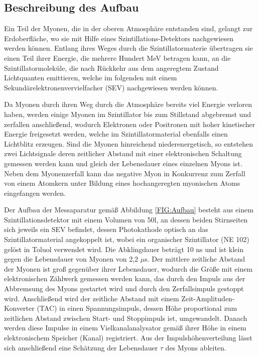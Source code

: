 \subsection{Beschreibung des Aufbau}
Ein Teil der Myonen, die in der oberen Atmosphäre entstanden sind, gelangt zur Erdoberfläche, wo sie  mit Hilfe eines Szintillations-Detektors nachgewiesen werden können. Entlang ihres Weges durch die Szintillatormaterie übertragen sie einen Teil ihrer Energie, die mehrere Hundert MeV betragen kann, an die Szintillatormoleküle, die nach Rückkehr aus dem angeregtem Zustand Lichtquanten emittieren, welche im folgenden mit einem Sekundärelektronenvervielfacher (SEV) nachgewiesen werden können.

Da Myonen durch ihren Weg durch die Atmosphäre bereits viel Energie verloren haben, werden einige Myonen im Szintillator bis zum Stillstand abgebremst und zerfallen anschließend, wodurch Elektronen oder Positronen mit hoher kinetischer Energie freigesetzt werden, welche im Szintillatormaterial ebenfalls einen Lichtblitz erzeugen. Sind die Myonen hinreichend niederenergetisch, so entstehen zwei Lichtsignale deren zeitlicher Abstand mit einer elektronischen Schaltung gemessen werden kann und gleich der Lebensdauer eines einzelnen Myons ist. Neben dem Myonenzerfall kann das negative Myon in Konkurrenz zum Zerfall von einem Atomkern unter Bildung eines hochangeregten myonischen Atoms eingefangen werden.

Der Aufbau der Messaparatur gemäß Abbildung \ref{FIG:Aufbau} besteht aus einem Szintillationsdetektor mit einem Volumen von 50l, an dessen beiden Stirnseiten sich jeweils ein SEV befindet, dessen Photokathode optisch an das Szintillatormaterial angekoppelt ist, wobei ein organischer Szintillator (NE  102) gelöst in Toluol verwendet wird. Die Abklingdauer beträgt 10 ns und ist klein gegen die Lebensdauer von Myonen von 2,2 $\mu$s\cite{PDG}. Der mittlere zeitliche Abstand der Myonen ist groß gegenüber ihrer Lebensdauer, wodurch die Größe mit einem elektronischen Zählwerk gemessen werden kann, das durch den Impuls aus der Abbremsung des Myons gestartet wird und durch den Zerfallsimpuls gestoppt wird. Anschließend wird der zeitliche Abstand mit einem Zeit-Amplituden-Konverter (TAC) in einen Spannungsimpuls, dessen Höhe proportional zum zeitlichen Abstand zwischen Start- und Stoppimpuls ist, umgewandelt. Danach werden diese Impulse in einem Vielkanalanalysator gemäß ihrer Höhe in einem elektronischem Speicher (Kanal) registriert. Aus der Impulshöhenverteilung lässt sich anschließend  eine Schätzung der Lebensdauer $\tau$ des Myons ableiten.

